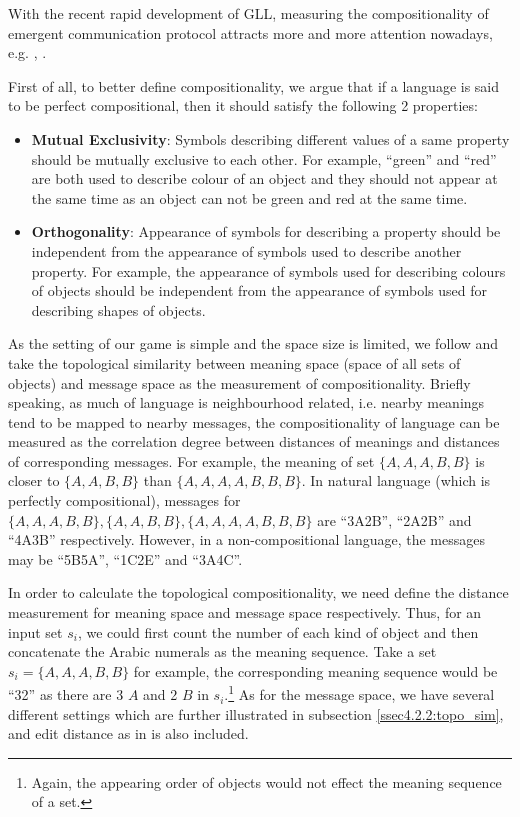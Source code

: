 With the recent rapid development of GLL, measuring the compositionality of emergent communication protocol attracts more and more attention nowadays, e.g. \cite{andreas2019measuring}, \cite{lowe2019pitfalls}.

First of all, to better define compositionality, we argue that if a language is said to be perfect compositional, then it should satisfy the following 2 properties:

\begin{itemize}
    \item \textbf{Mutual Exclusivity}: Symbols describing different values of a same property should be mutually exclusive to each other. For example, ``green'' and ``red'' are both used to describe colour of an object and they should not appear at the same time as an object can not be green and red at the same time.
    \item \textbf{Orthogonality}: Appearance of symbols for describing a property should be independent from the appearance of symbols used to describe another property. For example, the appearance of symbols used for describing colours of objects should be independent from the appearance of symbols used for describing shapes of objects.
\end{itemize}

As the setting of our game is simple and the space size is limited, we follow \cite{brighton2006understanding} and take the topological similarity between meaning space (space of all sets of objects) and message space as the measurement of compositionality. Briefly speaking, as much of language is neighbourhood related, i.e. nearby meanings tend to be mapped to nearby messages, the compositionality of language can be measured as the correlation degree between distances of meanings and distances of corresponding messages. For example, the meaning of set $\{A,A,A,B,B\}$ is closer to $\{A,A,B,B\}$ than $\{A,A,A,A,B,B,B\}$. In natural language (which is perfectly compositional), messages for  $\{A,A,A,B,B\}, \{A,A,B,B\}, \{A,A,A,A,B,B,B\}$ are ``3A2B'', ``2A2B'' and ``4A3B'' respectively. However, in a non-compositional language, the messages may be ``5B5A'', ``1C2E'' and ``3A4C''.

In order to calculate the topological compositionality, we need define the distance measurement for meaning space and message space respectively. Thus, for an input set $s_i$, we could first count the number of each kind of object and then concatenate the Arabic numerals as the meaning sequence. Take a set $s_i=\{A, A, A, B, B\}$ for example, the corresponding meaning sequence would be ``32'' as there are 3 $A$ and 2 $B$ in $s_i$.\footnote{Again, the appearing order of objects would not effect the meaning sequence of a set.} As for the message space, we have several different settings which are further illustrated in subsection \ref{ssec4.2.2:topo_sim}, and edit distance as in \cite{brighton2006understanding} is also included.

